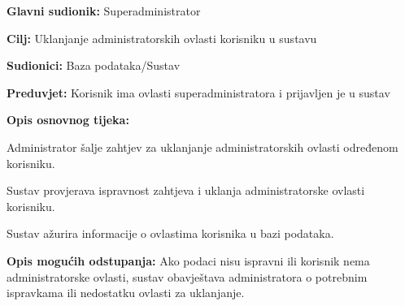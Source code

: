                 \noindent {}
					\begin{packed_item}
	
						\item \textbf{Glavni sudionik: }Superadministrator
						\item  \textbf{Cilj:} Uklanjanje administratorskih ovlasti korisniku u sustavu
						\item  \textbf{Sudionici:} Baza podataka/Sustav
						\item  \textbf{Preduvjet:} Korisnik ima ovlasti superadministratora i prijavljen je u sustav
						\item  \textbf{Opis osnovnog tijeka:}
						
						\item[] \begin{packed_enum}
	
							\item Administrator šalje zahtjev za uklanjanje administratorskih ovlasti određenom korisniku.
							\item Sustav provjerava ispravnost zahtjeva i uklanja administratorske ovlasti korisniku.
                            \item Sustav ažurira informacije o ovlastima korisnika u bazi podataka.
	
						\end{packed_enum}
						
						\item  \textbf{Opis mogućih odstupanja:} Ako podaci nisu ispravni ili korisnik nema administratorske ovlasti, sustav obavještava administratora o potrebnim ispravkama ili nedostatku ovlasti za uklanjanje.
						
						
					\end{packed_item}

